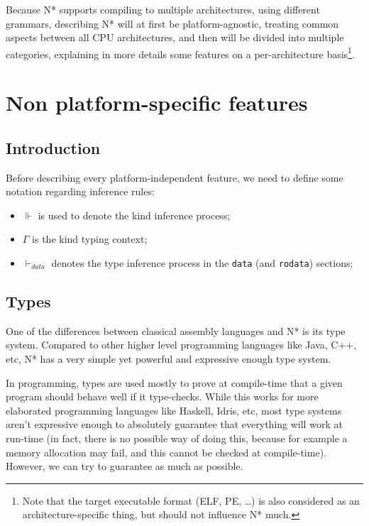 \vspace{\baselineskip}

Because N* supports compiling to multiple architectures, using different grammars, describing N* will at first be platform-agnostic, treating common aspects between all CPU architectures, and then will be divided into multiple categories, explaining in more details some features on a per-architecture basis\footnote{Note that the target executable format (ELF, PE, \ldots) is also considered as an architecture-specific thing, but should not influence N* much.}.

\chapter{Non platform-specific features}\label{chap:nstar-common}

\section{Introduction}\label{sec:nstar-common-introduction}

Before describing every platform-independent feature, we need to define some notation regarding inference rules:
\begin{itemize}
  \item $\Vdash$ is used to denote the kind inference process;
  \item $\Gamma$ is the kind typing context;
  \item $\vdash_{data}$ denotes the type inference process in the \texttt{data} (and \texttt{rodata}) sections;
\end{itemize}

\section{Types}\label{sec:nstar-common-ts}

One of the differences between classical assembly languages and N* is its type system.
Compared to other higher level programming languages like Java, C++, etc, N* has a very simple yet powerful and expressive enough type system.

In programming, types are used mostly to prove at compile-time that a given program should behave well if it type-checks. While this works for more elaborated programming languages like Haskell, Idris, etc, most type systems aren't expressive enough to absolutely guarantee that everything will work at run-time (in fact, there is no possible way of doing this, because for example a memory allocation may fail, and this cannot be checked at compile-time). However, we can try to guarantee as much as possible.

